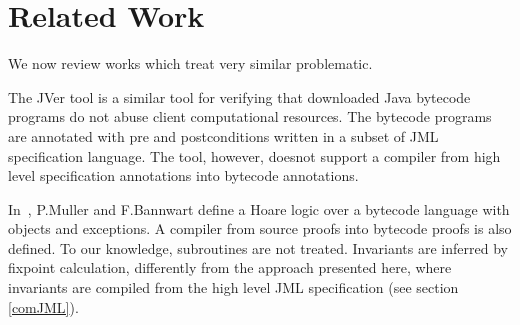 \section{Related Work} \label{relWork}


We now review works which treat very similar problematic.


The JVer tool \cite{DBLP:conf/cav/ChanderEILN05} is a similar tool for verifying that downloaded Java bytecode programs do not abuse client computational resources.
The bytecode programs are annotated with pre and postconditions written in a subset of JML specification language. The tool, however, doesnot support a compiler from high level specification annotations into bytecode annotations.  

 
In~\cite{BM05plb},  P.Muller and F.Bannwart define a Hoare logic over a 
bytecode language with objects and  exceptions. A compiler from source proofs into bytecode proofs is also defined.
 To our knowledge, subroutines are not treated. Invariants are inferred by fixpoint calculation, differently 
from the approach presented here, where invariants are compiled from the high level JML specification (see section \ref{comJML}). 
 
